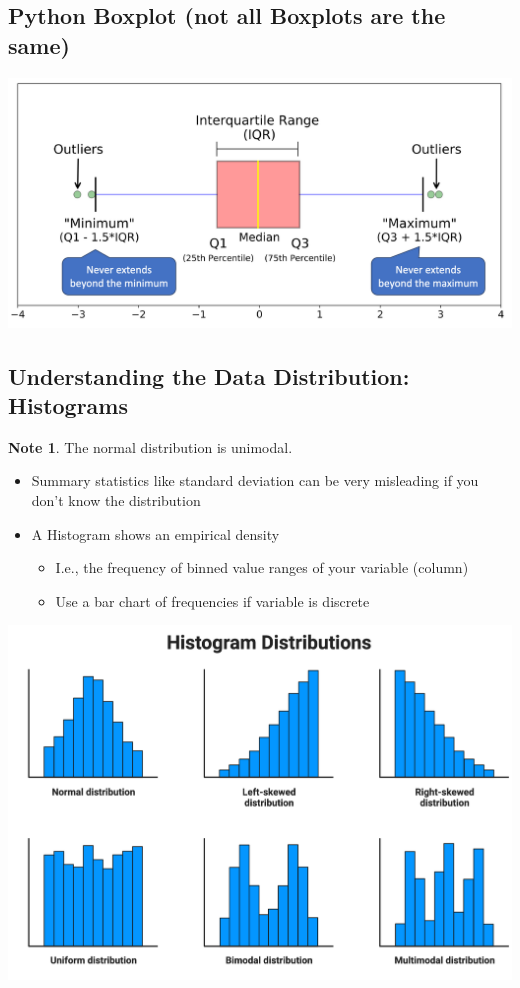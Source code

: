 \documentclass[11pt]{article}
\theoremstyle{definition}
\newtheorem{note}{Note}
\begin{document}
\subsection{Python Boxplot (not all Boxplots are the same)}
\includegraphics[width=\textwidth]{9.png}
\subsection{Understanding the Data Distribution: Histograms}
\begin{note}
    The normal distribution is unimodal.
\end{note}
\begin{itemize}
    \item Summary statistics
    like standard deviation
    can be very misleading if
    you don’t know the
    distribution
    \item A Histogram shows an
    empirical density
    \begin{itemize}
        \item I.e., the frequency of
        binned value ranges of
        your variable (column)
        \item Use a bar chart of
        frequencies if variable is
        discrete
    \end{itemize}
\end{itemize}
\includegraphics[width=\textwidth]{10.png}
\end{document}
